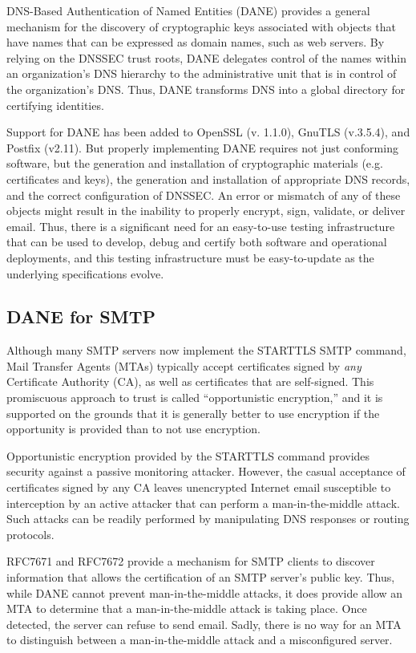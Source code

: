 \documentclass[preprint,3p,11pt]{elsarticle}
\begin{document}
DNS-Based Authentication of Named Entities\cite{rfc7671} (DANE)
provides a general mechanism for the discovery of cryptographic keys
associated with objects that have names that can be expressed as
domain names, such as web servers. By relying on the DNSSEC\cite{rfc3833}
trust roots, DANE delegates control of the names within an
organization's DNS hierarchy to the administrative unit that is in
control of the organization's DNS. Thus, DANE transforms DNS into a
global directory for certifying identities.

Support for DANE has been added to OpenSSL (v. 1.1.0), GnuTLS
(v.3.5.4), and Postfix (v2.11). But properly implementing DANE requires not just conforming
software, but the generation and installation of cryptographic
materials (e.g. certificates and keys), the generation and installation of appropriate DNS
records, and the correct configuration of DNSSEC. An error or mismatch of any of these
objects might result in the inability to properly encrypt, sign,
validate, or deliver email. Thus, there is a significant need for an
easy-to-use testing infrastructure that can be used to develop, debug
and certify both software and operational deployments, and this testing infrastructure
must be easy-to-update as the underlying specifications evolve.

\subsection{DANE for SMTP}

Although many SMTP servers now implement the STARTTLS SMTP
command\cite{rfc3207}, Mail Transfer Agents (MTAs) typically
accept certificates signed by \emph{any} Certificate Authority (CA),
as well as certificates that are self-signed. This promiscuous
approach to trust is called ``opportunistic encryption,'' and it is
supported on the grounds that it is generally better to use encryption
if the opportunity is provided than to not use encryption.

Opportunistic encryption provided by the STARTTLS command provides security
against a passive monitoring attacker. However, the casual acceptance
of certificates signed by any CA leaves unencrypted Internet email
susceptible to interception by an active attacker that can perform a
man-in-the-middle attack. Such attacks can be readily performed by
manipulating DNS responses or routing protocols.

RFC7671\cite{rfc761} and RFC7672\cite{rfc7672} provide a mechanism for SMTP clients to discover
information that allows the certification of an SMTP server's public
key. Thus, while DANE cannot prevent
man-in-the-middle attacks, it does provide allow an MTA 
to determine that a man-in-the-middle attack is taking place. Once
detected, the server can refuse to send email. Sadly, there is no way
for an MTA to distinguish between a man-in-the-middle attack and a
misconfigured server.
\end{document}
